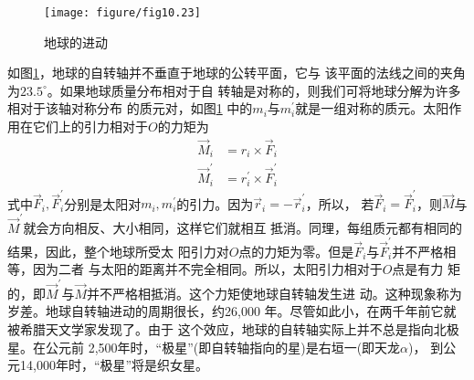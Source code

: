 \vspace{1.5em}
\begin{figure}[h]
    \centering
    \texttt{[image: figure/fig10.23]}
    \caption{地球的进动}
    \label{fig:10.23}
\end{figure}

如图\ref{fig:10.23}，地球的自转轴并不垂直于地球的公转平面，它与
该平面的法线之间的夹角为$ 23.5 ^ \circ $。如果地球质量分布相对于自
转轴是对称的，则我们可将地球分解为许多相对于该轴对称分布
的质元对，如图\ref{fig:10.23} 中的$ m _ i $与$ m _ i ^ \prime $就是一组对称的质元。太阳作
用在它们上的引力相对于$ O $的力矩为
\begin{equation*}
    \begin{split}
        \vec{M} _ { i } &= r _ { i } \times \vec{F} _ i \\
        \vec{M} _ { i } ^ { \prime } &= r _ { i } ^ { \prime } \times \vec{F} _ i ^ \prime
    \end{split}
\end{equation*}
式中$ \vec{F} _ i,  \vec{F} _ i ^ \prime$分别是太阳对$ m _ i , m _ i ^ \prime $的引力。因为$ \vec{r} _ i = - \vec{r} _i ^ \prime $，所以，
若$ \vec{F} _ i = \vec{F} _ i ^ \prime $，则$\vec{M}$与$\vec{M} ^ \prime$就会方向相反、大小相同，这样它们就相互
抵消。同理，每组质元都有相同的结果，因此，整个地球所受太
阳引力对$ O $点的力矩为零。但是$ \vec{F} _ i $与$ \vec{F} _ i ^ \prime $并不严格相等，因为二者
与太阳的距离并不完全相同。所以，太阳引力相对于$ O $点是有力
矩的，即$\vec{M} ^ \prime$与$\vec{M}$并不严格相抵消。这个力矩使地球自转轴发生进
动。这种现象称为岁差。地球自转轴进动的周期很长，约26,000
年。尽管如此小，在两千年前它就被希腊天文学家发现了。由于
这个效应，地球的自转轴实际上并不总是指向北极星。在公元前
2,500年时，“极星”(即自转轴指向的星)是右垣一(即天龙$ \alpha $)，
到公元14,000年时，“极星”将是织女星。